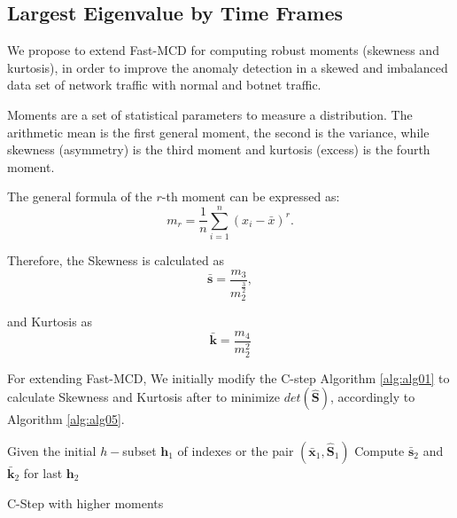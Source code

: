\documentclass[review]{elsarticle}
\begin{document}
\subsection{Largest Eigenvalue by Time Frames}
\label{sec:prop_LargestEigenvaluebyTimeFrames}

We propose to extend Fast-MCD for computing robust moments (skewness and kurtosis), in order to improve the anomaly detection in a skewed and imbalanced data set of network traffic with normal and botnet traffic.
	    
Moments are a set of statistical parameters to measure a distribution. The arithmetic mean is the first general moment, the second is the variance, while skewness (asymmetry) is the third moment and kurtosis (excess) is the fourth moment.

The general formula of the $r$-th moment can be expressed as:
\begin{equation}\label{eq:eq05}
	m_r = \displaystyle\frac{1}{n}\displaystyle\sum_{i = 1}^{n}( x_i - \bar{x})^r. 
\end{equation}

Therefore, the Skewness is calculated as
\begin{equation}\label{eq:eq06}
	\boldsymbol{\bar{s}} = \frac{m_3}{m_2^{\frac{3}{2}}},
\end{equation}

and Kurtosis as
\begin{equation}\label{eq:eq07}
	\boldsymbol{\bar{k}} = \frac{m_4}{m_2^2} 
\end{equation}

For extending Fast-MCD, We initially modify the C-step Algorithm \ref{alg:alg01} to calculate Skewness and Kurtosis after to minimize $det(\boldsymbol{\hat{S}})$, accordingly to Algorithm \ref{alg:alg05}.

\begin{algorithm}
	\label{alg:alg05}
	\scriptsize
	\SetAlgoLined
	Given the initial $h-$subset $\boldsymbol{h}_1$ of indexes or the pair $(\boldsymbol{\bar{x}}_1, \boldsymbol{\hat{S}}_1)$\;
	Compute $\boldsymbol{\bar{s}}_2$ and $\boldsymbol{\bar{k}}_2$ for last $\boldsymbol{h}_2$\;
	\caption{C-Step with higher moments}
\end{algorithm}
\end{document}
